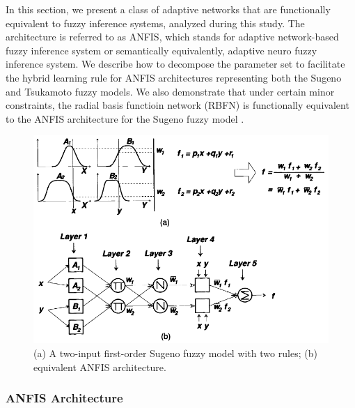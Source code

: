 In this section, we present a class of adaptive networks that are functionally equivalent to fuzzy inference systems, analyzed during this study. The architecture is referred to as ANFIS, which stands for adaptive network-based fuzzy inference system or semantically equivalently, adaptive neuro fuzzy inference system. We describe how to decompose the parameter set to facilitate the hybrid learning rule for ANFIS architectures representing both the Sugeno and Tsukamoto fuzzy models. We also demonstrate that under certain minor constraints, the radial basis functioin network (RBFN) is functionally equivalent to the ANFIS architecture for the Sugeno fuzzy model \cite{jang1997neuro}.

\begin{figure}[h]
	\centering
	\includegraphics[width=.7\textwidth]{image/anfis.png}
	\caption{(a) A two-input first-order Sugeno fuzzy model with two rules; (b) equivalent ANFIS architecture.}
	\label{fig:anfis}
\end{figure}

\subsubsection{ANFIS Architecture}

